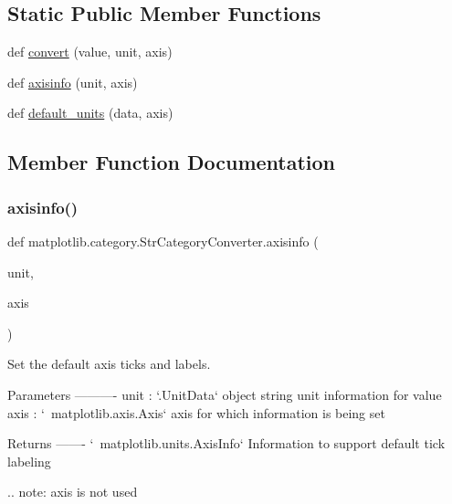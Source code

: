 \subsection*{Static Public Member Functions}
\begin{DoxyCompactItemize}
\item 
def \hyperlink{classmatplotlib_1_1category_1_1StrCategoryConverter_a63788082b85f23c179de550839c6e949}{convert} (value, unit, axis)
\item 
def \hyperlink{classmatplotlib_1_1category_1_1StrCategoryConverter_a76ae677dd1971c5f631374ab34367a0d}{axisinfo} (unit, axis)
\item 
def \hyperlink{classmatplotlib_1_1category_1_1StrCategoryConverter_a25039041c51db034d0fa4b607b8e00d9}{default\+\_\+units} (data, axis)
\end{DoxyCompactItemize}


\subsection{Member Function Documentation}
\mbox{\label{classmatplotlib_1_1category_1_1StrCategoryConverter_a76ae677dd1971c5f631374ab34367a0d}} 
\subsubsection{\texorpdfstring{axisinfo()}{axisinfo()}}
{\footnotesize\ttfamily def matplotlib.\+category.\+Str\+Category\+Converter.\+axisinfo (\begin{DoxyParamCaption}\item[{}]{unit,  }\item[{}]{axis }\end{DoxyParamCaption})\hspace{0.3cm}{\ttfamily [static]}}

\begin{DoxyVerb}Set the default axis ticks and labels.

Parameters
----------
unit : `.UnitData`
    object string unit information for value
axis : `~matplotlib.axis.Axis`
    axis for which information is being set

Returns
-------
`~matplotlib.units.AxisInfo`
    Information to support default tick labeling

.. note: axis is not used
\end{DoxyVerb}
 \mbox{\label{classmatplotlib_1_1category_1_1StrCategoryConverter_a63788082b85f23c179de550839c6e949}} 
